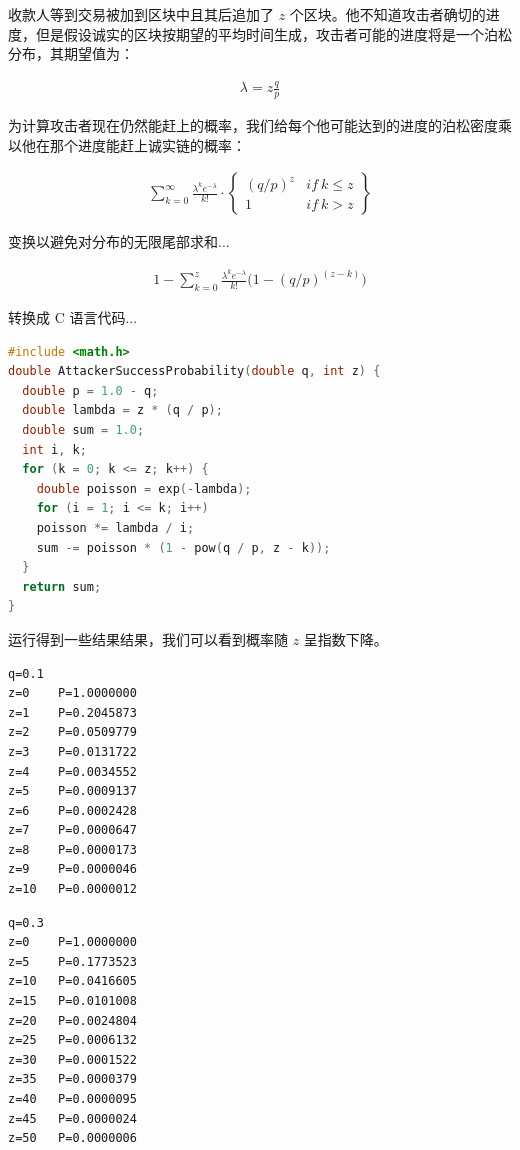 \documentclass{article}
\begin{document}
收款人等到交易被加到区块中且其后追加了 $z$ 个区块。他不知道攻击者确切的进度，但是假设诚实的区块按期望的平均时间生成，攻击者可能的进度将是一个泊松分布，其期望值为：

\begin{align*}
 \lambda = z\frac{q}{p}
\end{align*}

为计算攻击者现在仍然能赶上的概率，我们给每个他可能达到的进度的泊松密度乘以他在那个进度能赶上诚实链的概率：

\begin{align*}
 \sum_{k = 0}^{\infty}
 \frac{\lambda^ke^{-\lambda}}{k!}
 \cdot
 \begin{Bmatrix}
  (q / p)^z & if \ k \leq z \\
  1         & if \ k > z    
 \end{Bmatrix}
\end{align*}

变换以避免对分布的无限尾部求和...

\begin{align*}
 1-
 \sum_{k = 0}^{z}
 \frac{\lambda^ke^{-\lambda}}{k!}
 \big(1 - (q / p)^{(z - k)}\big)
\end{align*}

转换成 C 语言代码...

\begin{lstlisting}[language=C]
#include <math.h>
double AttackerSuccessProbability(double q, int z) {
  double p = 1.0 - q;
  double lambda = z * (q / p);
  double sum = 1.0;
  int i, k;
  for (k = 0; k <= z; k++) {
    double poisson = exp(-lambda);
    for (i = 1; i <= k; i++)
    poisson *= lambda / i;
    sum -= poisson * (1 - pow(q / p, z - k));
  }
  return sum;
}
\end{lstlisting}

运行得到一些结果结果，我们可以看到概率随 $z$ 呈指数下降。

\begin{lstlisting}
q=0.1
z=0    P=1.0000000
z=1    P=0.2045873
z=2    P=0.0509779
z=3    P=0.0131722
z=4    P=0.0034552
z=5    P=0.0009137
z=6    P=0.0002428
z=7    P=0.0000647
z=8    P=0.0000173
z=9    P=0.0000046
z=10   P=0.0000012
\end{lstlisting}

\begin{lstlisting}
q=0.3
z=0    P=1.0000000
z=5    P=0.1773523
z=10   P=0.0416605
z=15   P=0.0101008
z=20   P=0.0024804
z=25   P=0.0006132
z=30   P=0.0001522
z=35   P=0.0000379
z=40   P=0.0000095
z=45   P=0.0000024
z=50   P=0.0000006
\end{lstlisting}
\end{document}
